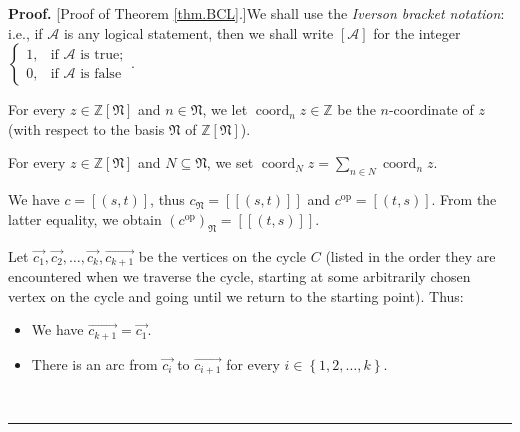 \documentclass
[numbers=enddot,12pt,final,onecolumn,notitlepage,abstracton]{scrartcl}%
\theoremstyle{definition}
\newenvironment{proof}[1][Proof]{\noindent\textbf{#1.} }{\ \rule{0.5em}{0.5em}}
\let\sumnonlimits\sum
\renewcommand{\sum}{\sumnonlimits\limits}
\begin{document}
\begin{proof}
[Proof of Theorem \ref{thm.BCL}.]We shall use the \emph{Iverson bracket
notation}: i.e., if $\mathcal{A}$ is any logical statement, then we shall
write $\left[  \mathcal{A}\right]  $ for the integer $%
\begin{cases}
1, & \text{if }\mathcal{A}\text{ is true};\\
0, & \text{if }\mathcal{A}\text{ is false}%
\end{cases}
$.

For every $z\in\mathbb{Z}\left[  \mathfrak{N}\right]  $ and $n\in\mathfrak{N}%
$, we let $\operatorname*{coord}\nolimits_{n}z\in\mathbb{Z}$ be the
$n$-coordinate of $z$ (with respect to the basis $\mathfrak{N}$ of
$\mathbb{Z}\left[  \mathfrak{N}\right]  $).

For every $z\in\mathbb{Z}\left[  \mathfrak{N}\right]  $ and $N\subseteq
\mathfrak{N}$, we set $\operatorname*{coord}\nolimits_{N}z=\sum_{n\in
N}\operatorname*{coord}\nolimits_{n}z$.

We have $c=\left[  \left(  s,t\right)  \right]  $, thus $c_{\mathfrak{N}%
}=\left[  \left[  \left(  s,t\right)  \right]  \right]  $ and
$c^{\operatorname{op}}=\left[  \left(  t,s\right)  \right]  $. From the latter
equality, we obtain $\left(  c^{\operatorname*{op}}\right)  _{\mathfrak{N}%
}=\left[  \left[  \left(  t,s\right)  \right]  \right]  $.

Let $\overrightarrow{c_{1}},\overrightarrow{c_{2}},\ldots
,\overrightarrow{c_{k}},\overrightarrow{c_{k+1}}$ be the vertices on the cycle
$C$ (listed in the order they are encountered when we traverse the cycle,
starting at some arbitrarily chosen vertex on the cycle and going until we
return to the starting point). Thus:

\begin{itemize}
\item We have $\overrightarrow{c_{k+1}}=\overrightarrow{c_{1}}$.

\item There is an arc from $\overrightarrow{c_{i}}$ to
$\overrightarrow{c_{i+1}}$ for every $i\in\left\{  1,2,\ldots,k\right\}  $.
\end{itemize}


\end{proof}
\end{document}
